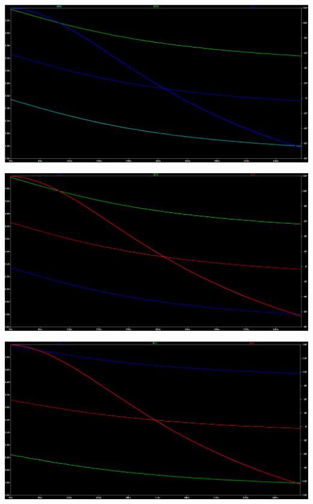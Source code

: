 \documentclass[journal]{IEEEtran}
\begin{document}
\begingroup
    \centering
    \medskip
    \includegraphics[width=\columnwidth]{images/Lab_9_ss_2.PNG}
    \label{fig:current_resistor}
    \medskip
\endgroup


\begingroup
    \centering
    \medskip
    \includegraphics[width=\columnwidth]{images/Lab_9_ss_3.PNG}
    \label{fig:current_inductor}
    \medskip
\endgroup


\begingroup
    \centering
    \medskip
    \includegraphics[width=\columnwidth]{images/Lab_9_ss_4.PNG}
    \label{fig:current_power_source}
    \medskip
\endgroup
\end{document}
